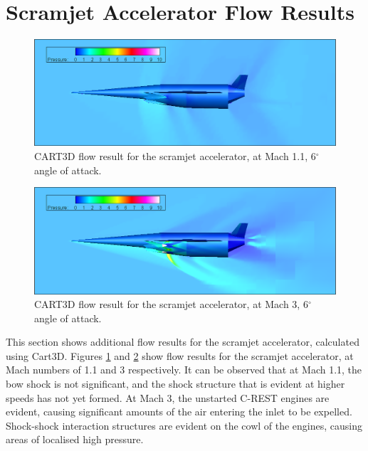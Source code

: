 \section{Scramjet Accelerator Flow Results}
\begin{figure}[ht]
	\centering
	\includegraphics[width=0.9\linewidth]{figures/3_vehicle_design/M1p1AoA6}
	\caption{CART3D flow result for the scramjet accelerator, at Mach 1.1, 6$^\circ$ angle of attack.}
	\label{fig:M1}
\end{figure}
\begin{figure}[ht]
	\centering
	\includegraphics[width=0.9\linewidth]{figures/3_vehicle_design/M3AoA6}
	\caption{CART3D flow result for the scramjet accelerator, at Mach 3, 6$^\circ$ angle of attack.}
	\label{fig:M3AoA6}
\end{figure}
\noindent
This section shows additional flow results for the scramjet accelerator, calculated using Cart3D.
Figures \ref{fig:M1} and \ref{fig:M3AoA6} show flow results for the scramjet accelerator, at Mach numbers of 1.1 and 3 respectively. It can be observed that at Mach 1.1, the bow shock is not significant, and the shock structure that is evident at higher speeds has not yet formed. At Mach 3, the unstarted C-REST engines are evident, causing significant amounts of the air entering the inlet to be expelled. Shock-shock interaction structures are evident on the cowl of the engines, causing areas of localised high pressure.
\FloatBarrier
